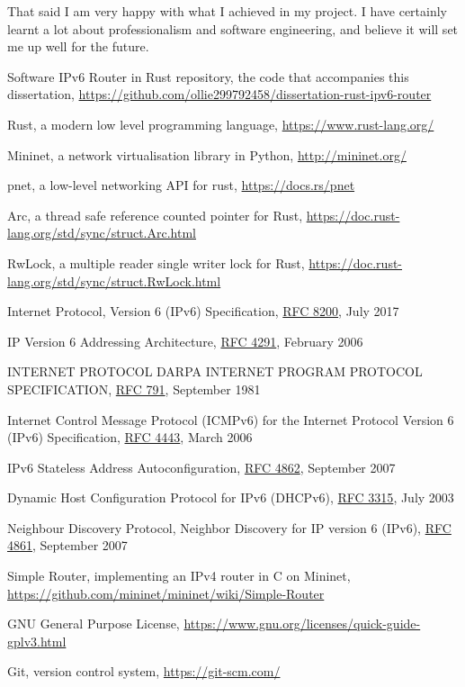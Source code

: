 \documentclass[12pt,a4paper,twoside,openright]{report}
\begin{document}
\bigskip

That said I am very happy with what I achieved in my project. I have certainly learnt a lot about professionalism and software engineering, and believe it will set me up well for the future.

\begin{thebibliography}{1}

 Software IPv6 Router in Rust repository, the code that accompanies this dissertation, \url{https://github.com/ollie299792458/dissertation-rust-ipv6-router}

 Rust, a modern low level programming language, \url{https://www.rust-lang.org/}

 Mininet, a network virtualisation library in Python, \url{http://mininet.org/}

 pnet, a low-level networking API for rust, \url{https://docs.rs/pnet}

 Arc, a thread safe reference counted pointer for Rust, \url{https://doc.rust-lang.org/std/sync/struct.Arc.html}

RwLock, a multiple reader single writer lock for Rust, \url{https://doc.rust-lang.org/std/sync/struct.RwLock.html}

 Internet Protocol, Version 6 (IPv6) Specification, \href{https://tools.ietf.org/html/rfc8200}{RFC 8200}, July 2017

 IP Version 6 Addressing Architecture, \href{https://tools.ietf.org/html/rfc4291}{RFC 4291}, February 2006

 INTERNET PROTOCOL DARPA INTERNET PROGRAM PROTOCOL SPECIFICATION, \href{https://tools.ietf.org/html/rfc791}{RFC 791}, September 1981

 Internet Control Message Protocol (ICMPv6) for the Internet Protocol Version 6 (IPv6) Specification, \href{https://tools.ietf.org/html/rfc4443}{RFC 4443}, March 2006

 IPv6 Stateless Address Autoconfiguration, \href{https://tools.ietf.org/html/rfc4862}{RFC 4862}, September 2007

 Dynamic Host Configuration Protocol for IPv6 (DHCPv6), \href{https://tools.ietf.org/html/rfc3315}{RFC 3315}, July 2003

 Neighbour Discovery Protocol, Neighbor Discovery for IP version 6 (IPv6), \href{https://tools.ietf.org/html/rfc4861}{RFC 4861}, September 2007

 Simple Router, implementing an IPv4 router in C on Mininet, \url{https://github.com/mininet/mininet/wiki/Simple-Router}

 GNU General Purpose License, \url{https://www.gnu.org/licenses/quick-guide-gplv3.html}

 Git, version control system, \url{https://git-scm.com/}

\end{thebibliography}
\end{document}
